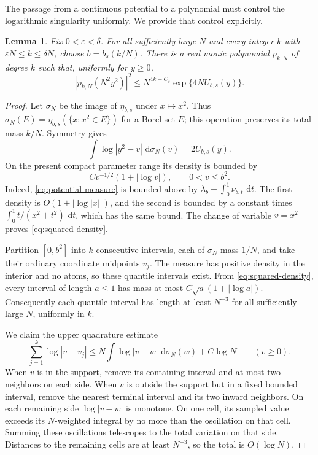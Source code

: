 \documentclass[11pt,letterpaper]{article}
\newtheorem{lemma}[lemma]{Lemma}
\theoremstyle{definition}
\newcommand{\dd}{\,\mathrm d}
\begin{document}
The passage from a continuous potential to a polynomial must control the
logarithmic singularity uniformly. We provide that control explicitly.

\begin{lemma}\label{lem:quantile-bound}
Fix $0<\varepsilon<\delta$. For all sufficiently large $N$ and every integer $k$ with
$\varepsilon N\le k\le\delta N$, choose $b=b_s(k/N)$. There is a real monic
polynomial $p_{k,N}$ of degree $k$ such that, uniformly for $y\ge0$,
\begin{equation}\label{eq:trial-polynomial}
 |p_{k,N}(N^2y^2)|^2
 \le N^{4k+C_\varepsilon}\exp\{4NU_{b,s}(y)\}.
\end{equation}
\end{lemma}
\begin{proof}
Let $\sigma_N$ be the image of $\eta_{b,s}$ under $x\mapsto x^2$.
Thus $\sigma_N(E)=\eta_{b,s}(\{x:x^2\in E\})$ for a Borel set $E$;
this operation preserves its total mass $k/N$. Symmetry gives
\begin{equation}\label{eq:fold-potential}
 \int\log|y^2-v|\,\dd\sigma_N(v)=2U_{b,s}(y).
\end{equation}
On the present compact parameter range its density is bounded by
\begin{equation}\label{eq:squared-density}
 C v^{-1/2}(1+|\log v|),\qquad 0<v\le b^2.
\end{equation}
Indeed, \eqref{eq:potential-measure} is bounded above by
$\lambda_b+\int_0^1\nu_{b,t}\,\dd t$. The first density is
$O(1+|\log|x||)$, and the second is bounded by a constant times
$\int_0^1 t/(x^2+t^2)\,\dd t$, which has the same bound. The change of
variable $v=x^2$ proves \eqref{eq:squared-density}.

Partition $[0,b^2]$ into $k$ consecutive intervals, each of
$\sigma_N$-mass $1/N$, and take their ordinary coordinate midpoints $v_j$.
The measure has positive density in the interior and no atoms, so these
quantile intervals exist. From \eqref{eq:squared-density}, every interval
of length $a\le1$ has mass at most $C\sqrt a(1+|\log a|)$.
Consequently each quantile interval has length at least $N^{-3}$ for all
sufficiently large $N$, uniformly in $k$.

We claim the upper quadrature estimate
\begin{equation}\label{eq:log-quadrature}
 \sum_{j=1}^k\log|v-v_j|
 \le N\int\log|v-w|\,\dd\sigma_N(w)+C\log N
 \qquad(v\ge0).
\end{equation}
When $v$ is in the support, remove its containing interval and at most two
neighbors on each side. When $v$ is outside the support but in a fixed
bounded interval, remove the nearest terminal interval and its two inward
neighbors. On each remaining side $\log|v-w|$ is monotone. On one cell, its
sampled value exceeds its $N$-weighted integral by no more than the
oscillation on that cell. Summing these oscillations telescopes to the
total variation on that side. Distances to the remaining cells are at
least $N^{-3}$, so the total is $O(\log N)$.


\end{proof}
\end{document}
